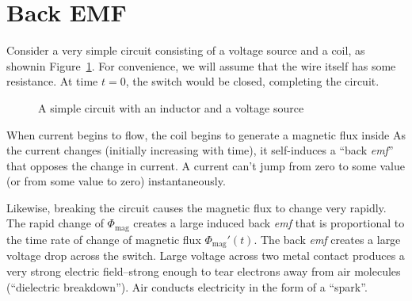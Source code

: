 \section{Back EMF}

Consider a very simple circuit consisting of a voltage source and a coil, as
shownin Figure~\ref{fig:back-emf1}. For convenience, we will assume that the
wire itself has some resistance. At time $t=0$, the switch would be closed,
completing the circuit.
\begin{figure}[ht]
  \centering
  \caption{A simple circuit with an inductor and a voltage source}
  \label{fig:back-emf1}
\end{figure}
When current begins to flow, the coil begins to generate a magnetic flux inside
As the current changes (initially increasing with time), it self-induces a
``back \emph{emf}'' that opposes the change in current. A current can't jump
from zero to some value (or from some value to zero) instantaneously.

%
%
%
Likewise, breaking the circuit causes the magnetic flux to change very rapidly.
The rapid change of $\Phi_\text{mag}$ creates a large induced back \emph{emf} that is
proportional to the time rate of change of magnetic flux $\Phi_\text{mag}'(t)$. The back
\emph{emf} creates a large voltage drop across the switch. Large voltage across
two metal contact produces a very strong electric field--strong enough to tear
electrons away from air molecules (``dielectric breakdown''). Air conducts
electricity in the form of a ``spark''.


